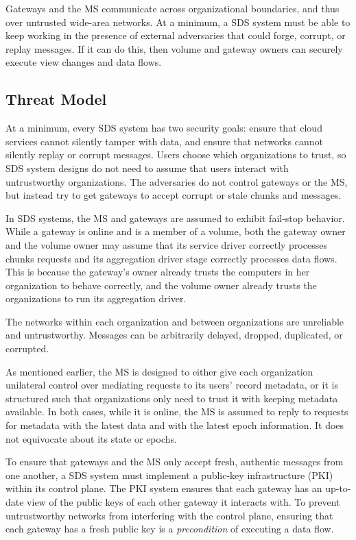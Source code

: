 Gateways and the MS communicate
across organizational boundaries, and thus over untrusted wide-area networks.
At a minimum, a SDS system must be able to keep working in the presence of external adversaries that could
forge, corrupt, or replay messages.  If it can do this, then volume and gateway owners can
securely execute view changes and data flows.

\subsection{Threat Model}

At a minimum, every SDS system has two security goals: ensure that cloud services
cannot silently tamper with data, and ensure that networks cannot silently replay
or corrupt messages.  Users choose which organizations to trust, so SDS system
designs do not need to assume that users interact with untrustworthy
organizations.  The adversaries do not control gateways or the MS, but
instead try to get gateways to accept corrupt or stale chunks and messages.

In SDS systems, the MS and gateways are assumed to exhibit fail-stop behavior.
While a gateway is online and is a member of a volume, both the gateway owner
and the volume owner may assume that its service driver
correctly processes chunks requests and its 
aggregation driver stage correctly processes data flows.  This is because the
gateway's owner already trusts the computers in her organization to behave
correctly, and the volume owner already trusts the organizations to run its
aggregation driver.

The networks within each organization and between organizations are unreliable
and untrustworthy.  Messages can be arbitrarily delayed, dropped, duplicated, or corrupted.

As mentioned earlier, the MS is designed to either give each organization
unilateral control over mediating requests to its users' record metadata, or it is structured such
that organizations only need to trust it with keeping metadata available.  In
both cases, while it is online, the MS is assumed to reply to requests for metadata with
the latest data and with the latest epoch information.  It does not equivocate
about its state or epochs.

To ensure that gateways and the MS only accept fresh, authentic messages from
one another, a SDS system must implement a public-key infrastructure (PKI) within
its control plane.  The PKI system ensures that each gateway has an up-to-date
view of the public keys of each other gateway it interacts with.  To prevent
untrustworthy networks from interfering with the control plane, ensuring
that each gateway has a fresh public key is a \emph{precondition} of executing a data
flow.

